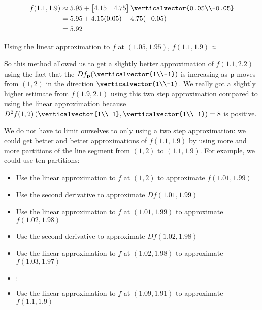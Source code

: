 \documentclass{ximera}
\begin{document}
\begin{question}
  \begin{solution}
    \begin{hint}
      \begin{align*}
        f(1.1,1.9) &\approx 5.95+\begin{bmatrix} 4.15 & 4.75 \end{bmatrix} \verticalvector{0.05\\-0.05}\\
        &=5.95+4.15(0.05)+4.75(-0.05)\\
        &=5.92
      \end{align*}
    \end{hint}
    Using the linear approximation to $f$ at $(1.05,1.95)$, $f(1.1,1.9) \approx$ 
  \end{solution}
  
  So this method allowed us to get a slightly better approximation of $f(1.1,2.2)$ using the fact that the $Df_{\mathbf{p}}(\verticalvector{1\\-1})$ is increasing
  as $\mathbf{p}$ moves from $(1,2)$ in the direction $\verticalvector{1\\-1}$.  We really got a slightly higher estimate from $f(1.9,2.1)$ using this two step
  approximation compared to using the linear approximation because 
  $D^2f(1,2)\left(\verticalvector{1\\-1},\verticalvector{1\\-1} \right) = 8$ is positive.  
  
  We do not have to limit ourselves to only using a two step approximation:  we could get better and better approximations of $f(1.1,1.9)$
  by using more and more partitions of the line segment from $(1,2)$ to $(1.1,1.9)$.  For example, we could use ten partitions:
  \begin{itemize}
  \item Use the linear approximation to $f$ at $(1,2)$ to approximate $f(1.01,1.99)$
  \item Use the second derivative to approximate $Df(1.01,1.99)$
  \item Use the linear approximation to $f$ at $(1.01,1.99)$ to approximate $f(1.02,1.98)$
  \item Use the second derivative to approximate $Df(1.02,1.98)$
  \item Use the linear approximation to $f$ at $(1.02,1.98)$ to approximate $f(1.03,1.97)$
  \item $\vdots$
  \item  Use the linear approximation to $f$ at $(1.09,1.91)$ to approximate $f(1.1,1.9)$
  \end{itemize}
  

\end{question}
\end{document}
